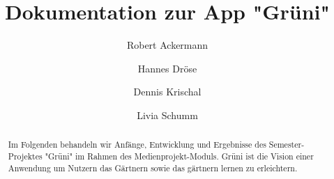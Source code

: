 \documentclass[sigchi, screen, nonacm]{acmart}
\begin{document}
\sloppy %

\title{Dokumentation zur App "Grüni"}


\author{Robert Ackermann}

\author{Hannes Dröse}

\author{Dennis Krischal}

\author{Livia Schumm}


\begin{abstract}
Im Folgenden behandeln wir Anfänge, Entwicklung und Ergebnisse des Semester-Projektes "Grüni" im Rahmen des Medienprojekt-Moduls. Grüni ist die Vision einer Anwendung um Nutzern das Gärtnern sowie das gärtnern lernen zu erleichtern.
\end{abstract}


\maketitle



\appendix
\end{document}

